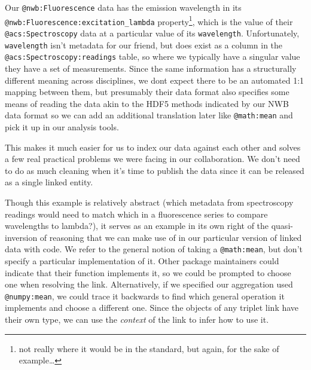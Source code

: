 Our \texttt{@nwb:Fluorescence} data has the emission wavelength in its
\texttt{@nwb:Fluorescence:excitation\_lambda} property\footnote{not
  really where it would be in the standard, but again, for the sake of
  example\ldots{}}, which is the value of their
\texttt{@acs:Spectroscopy} data at a particular value of its
\texttt{wavelength}. Unfortunately, \texttt{wavelength} isn't metadata
for our friend, but does exist as a column in the
\texttt{@acs:Spectroscopy:readings} table, so where we typically have a
singular value they have a set of measurements. Since the same
information has a structurally different meaning across disciplines, we
dont expect there to be an automated 1:1 mapping between them, but
presumably their data format also specifies some means of reading the
data akin to the HDF5 methods indicated by our NWB data format so we can
add an additional translation later like \texttt{@math:mean} and pick it
up in our analysis tools.

\begin{Shaded}
\begin{Highlighting}[]
\end{Highlighting}
\end{Shaded}

This makes it much easier for us to index our data against each other
and solves a few real practical problems we were facing in our
collaboration. We don't need to do as much cleaning when it's time to
publish the data since it can be released as a single linked entity.

Though this example is relatively abstract (which metadata from
spectroscopy readings would need to match which in a fluorescence series
to compare wavelengths to lambda?), it serves as an example in its own
right of the quasi-inversion of reasoning that we can make use of in our
particular version of linked data with code. We refer to the general
notion of taking a \texttt{@math:mean}, but don't specify a particular
implementation of it. Other package maintainers could indicate that
their function implements it, so we could be prompted to choose one when
resolving the link. Alternatively, if we specified our aggregation used
\texttt{@numpy:mean}, we could trace it backwards to find which general
operation it implements and choose a different one. Since the objects of
any triplet link have their own type, we can use the \emph{context} of
the link to infer how to use it.

